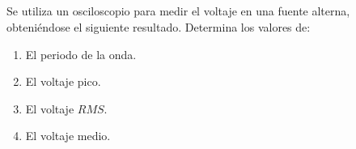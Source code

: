\documentclass[../main.tex]{subfiles}
\begin{document}
\subsection{}%

Se utiliza un osciloscopio para medir el voltaje en una fuente alterna,
obteniéndose el siguiente resultado.
Determina los valores de:

\begin{enumerate}[label=\alph*)]
	\item El periodo de la onda.
	\item El voltaje pico.
	\item El voltaje $RMS$.
	\item El voltaje medio.
\end{enumerate}
\end{document}
